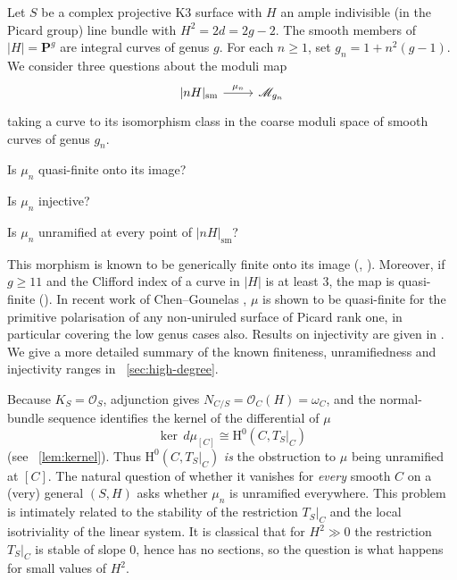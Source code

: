 \documentclass[a4paper,12pt,twoside,reqno]{amsart}
\makeatletter
\numberwithin{equation}{section}
\def\cr@pref#1:#2\@nil{#1}
\newcommand{\cr@tsing}[1]{\@nameuse{cr@map@\cr@pref#1:\@nil}}
\newcommand{\Cref}[1]{\cr@tsing{#1}~\ref{#1}}
\theoremstyle{plain}
\theoremstyle{definition}
\newcommand{\PP}{\mathbf{P}}
\newcommand{\Oc}{\mathscr{O}}
\newcommand{\sm}{\mathrm{sm}}
\newcommand{\Mmod}{\mathscr{M}}
\newcommand{\HH}{\mathrm{H}}
\theoremstyle{plain}
\theoremstyle{definition}
\makeatother
\begin{document}
Let $S$ be a complex projective K3 surface with $H$ an ample indivisible (in the Picard group) line bundle with $H^2=2d=2g-2$. The smooth members of $|H|=\PP^g$ are integral curves of genus $g$. For each $n\ge1$, set $g_n=1+n^2(g-1)$. We consider three questions about the moduli map
\[
\begin{tikzcd}
{|nH|_{\sm}} \arrow[r, "\mu_n"] & \Mmod_{g_n}
\end{tikzcd}
\]
taking a curve to its isomorphism class in the coarse moduli space of smooth curves of genus $g_n$.
\begin{description}[style=sameline,leftmargin=2em,labelsep=.5em,
    itemsep=.4\baselineskip,topsep=.5\baselineskip]
\item[\textbf{(Finiteness)}] Is $\mu_n$ quasi-finite onto its image?
\item[\textbf{(Injectivity)}] Is $\mu_n$ injective?
\item[\textbf{(Unramifiedness)}] Is $\mu_n$ unramified at every point of $|nH|_{\sm}$?
\end{description}

This morphism is known to be generically finite onto its image (\cite[Corollary 2]{BA}, \cite[Proposition 5.2]{DH}). Moreover, if $g \geq 11$ and the Clifford index of a curve in $|H|$ is at least $3$, the map is quasi-finite (\cite[Corollary 8.6]{CDS}). In recent work of Chen--Gounelas \cite{CG}, $\mu$ is shown to be quasi-finite for the primitive polarisation of any non-uniruled surface of Picard rank one, in particular covering the low genus cases also. Results on injectivity are given in \cite{FeyzbakhshI,FeyzbakhshII,CLW}. We give a more detailed summary of the known finiteness, unramifiedness and injectivity ranges in \Cref{sec:high-degree}.

Because $K_S=\Oc_S$, adjunction gives $N_{C/S}=\Oc_C(H)=\omega_C$, and the normal-bundle sequence identifies the kernel of the differential of $\mu$
\[     
   \ker\, d\mu_{[C]} \cong \HH^0(C,T_S|_C)
\] 
(see \Cref{lem:kernel}). Thus $\HH^0(C,T_S|_C)$ \emph{is} the obstruction to $\mu$ being unramified at $[C]$. The natural question of whether it vanishes for \emph{every} smooth $C$ on a (very) general $(S,H)$ asks whether $\mu_n$ is unramified everywhere. This problem is intimately related to the stability of the restriction $T_S|_C$ and the local isotriviality of the linear system. It is classical that for $H^2\gg0$ the restriction $T_S|_C$ is stable of slope $0$, hence has no sections, so the question is what happens for small values of $H^2$.
\end{document}

